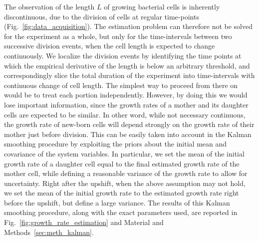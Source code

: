 The observation of the length $L$ of growing bacterial cells is inherently discontinuous, due to the division of cells at regular time-points (Fig.~\ref{fig:data_acquisition}).
The estimation problem can therefore not be solved for the experiment as a whole, but only for the time-intervals between two successive division events, when the cell length is expected to change continuously.
We localize the division events by identifying the time points at which the empirical derivative of the length is below an arbitrary threshold, and correspondingly slice the total duration of the experiment into time-intervals with continuous change of cell length.
The simplest way to proceed from there on would be to treat each portion independently.
However, by doing this we would lose important information, since the growth rates of a mother and its daughter cells are expected to be similar.
In other word, while not necessary continuous, the growth rate of new-born cells will depend strongly on the growth rate of their mother just before division.
This can be easily taken into account in the Kalman smoothing procedure by exploiting the priors about the initial mean and covariance of the system variables.
In particular, we set the mean of the initial growth rate of a daughter cell equal to the final estimated growth rate of the mother cell, while defining a reasonable variance of the growth rate to allow for uncertainty.
Right after the upshift, when the above assumption may not hold, we set the mean of the initial growth rate to the estimated growth rate right before the upshift, but define a large variance.
The results of this Kalman smoothing procedure, along with the exact parameters used, are reported in Fig.~\ref{fig:growth_rate_estimation} and Material and Methods~\ref{sec:meth_kalman}.

